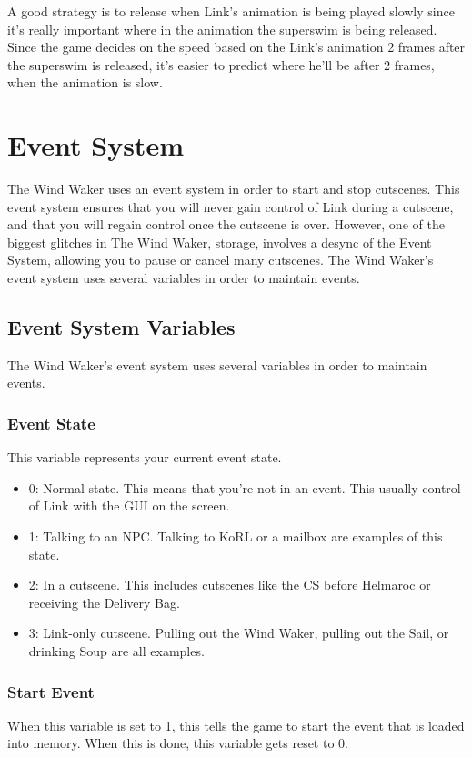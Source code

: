 \documentclass[titlepage,12pt,a4paper]{article}
\let\stdsection\section
\renewcommand\section{\newpage\stdsection}
\begin{document}
A good strategy is to release when Link's animation is being played slowly since it's really important where in the animation the superswim is being released. Since the game decides on the speed based on the Link's animation 2 frames after the superswim is released, it's easier to predict where he'll be after 2 frames, when the animation is slow.

\section{Event System}
The Wind Waker uses an event system in order to start and stop cutscenes. This event system ensures that you will never gain control of Link during a cutscene, and that you will regain control once the cutscene is over. However, one of the biggest glitches in The Wind Waker, storage, involves a desync of the Event System, allowing you to pause or cancel many cutscenes. The Wind Waker's event system uses several variables in order to maintain events.

\subsection{Event System Variables}
The Wind Waker's event system uses several variables in order to maintain events.
	
\subsubsection{Event State}
This variable represents your current event state.
\begin{itemize}
	\item 0: Normal state. This means that you're not in an event. This usually control of Link with the GUI on the screen.
	\item 1: Talking to an NPC. Talking to KoRL or a mailbox are examples of this state.
	\item 2: In a cutscene. This includes cutscenes like the CS before Helmaroc or receiving the Delivery Bag.
	\item 3: Link-only cutscene. Pulling out the Wind Waker, pulling out the Sail, or drinking Soup are all examples.
\end{itemize}

\subsubsection{Start Event}
When this variable is set to 1, this tells the game to start the event that is loaded into memory. When this is done, this variable gets reset to 0.
\end{document}
